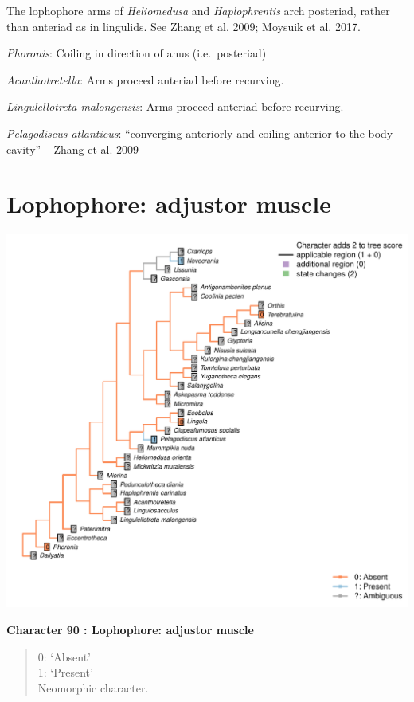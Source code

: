 \documentclass[]{book}
\theoremstyle{definition}
\theoremstyle{definition}
\theoremstyle{definition}
\theoremstyle{remark}
\begin{document}
The lophophore arms of \emph{Heliomedusa} and \emph{Haplophrentis} arch
posteriad, rather than anteriad as in lingulids. See Zhang et al. 2009;
Moysuik et al. 2017.

\emph{Phoronis}: Coiling in direction of anus (i.e.~posteriad)

\emph{Acanthotretella}: Arms proceed anteriad before recurving.

\emph{Lingulellotreta malongensis}: Arms proceed anteriad before
recurving.

\emph{Pelagodiscus atlanticus}: ``converging anteriorly and coiling
anterior to the body cavity'' -- Zhang et al. 2009

\hypertarget{lophophore-adjustor-muscle}{%
\section*{Lophophore: adjustor
muscle}\label{lophophore-adjustor-muscle}}

\includegraphics{Brachiopod_phylogeny_files/figure-latex/unnamed-chunk-5-90.pdf}

\textbf{Character 90 : Lophophore: adjustor muscle }

\begin{quote}
0: `Absent'\\
1: `Present'\\
Neomorphic character.
\end{quote}
\end{document}
